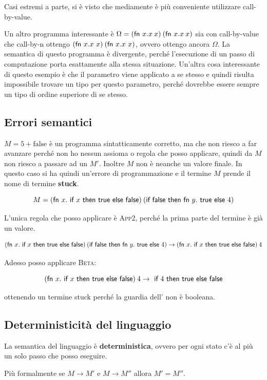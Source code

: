 Casi estremi a parte, si è visto che mediamente è più conveniente utilizzare call-by-value.

Un altro programma interessante è $\Omega = (\fn x.x \: x)\: (\fn x. x\:x)$ sia con call-by-value che call-by-n ottengo $(\fn x.x\ x)\: (\fn x.x\ x)$, ovvero ottengo ancora $\Omega$.
La semantica di questo programma è divergente, perché l'esecuzione di un passo di computazione porta esattamente alla stessa situazione.
Un'altra cosa interessante di questo esempio è che il parametro viene applicato a se stesso e quindi risulta impossibile trovare un tipo per questo parametro, perché dovrebbe essere sempre un tipo di ordine superiore di se stesso.

\subsection{Errori semantici}
$M = 5 + \text{false}$ è un programma sintatticamente corretto, ma che non riesco a far avanzare perché non ho nessun assioma o regola che posso applicare, quindi da $M$ non riesco a passare ad un $M'$. Inoltre $M$ non è neanche un valore finale.
In questo caso si ha quindi un'errore di programmazione e il termine $M$ prende il nome di termine \textbf{stuck}.


$$M = (\fn x.\iif x \text{ then true else false})\: (\text{if false then fn }y.\text{ true else } 4)$$

\noindent L'unica regola che posso applicare è \textsc{App2}, perché la prima parte del termine è già un valore.

$$(\fn x.\iif x \text{ then true else false}) \:(\text{if false then fn }y.\text{ true else } 4) \rightarrow (\fn x.\iif x \text{ then true else false})\: 4$$

\noindent Adesso posso applicare \textsc{Beta}:

$$(\fn x.\iif x \text{ then true else false})\: 4 \rightarrow \iif 4 \text{ then true else false}$$

\noindent ottenendo un termine stuck perché la guardia dell' non è booleana.

\subsection{Deterministicità del linguaggio}

La semantica del linguaggio è \textbf{deterministica}, ovvero per ogni stato c'è al più un solo passo che posso eseguire.

Più formalmente se $M \rightarrow M'$ e $M \rightarrow M''$ allora $M' = M''$.

